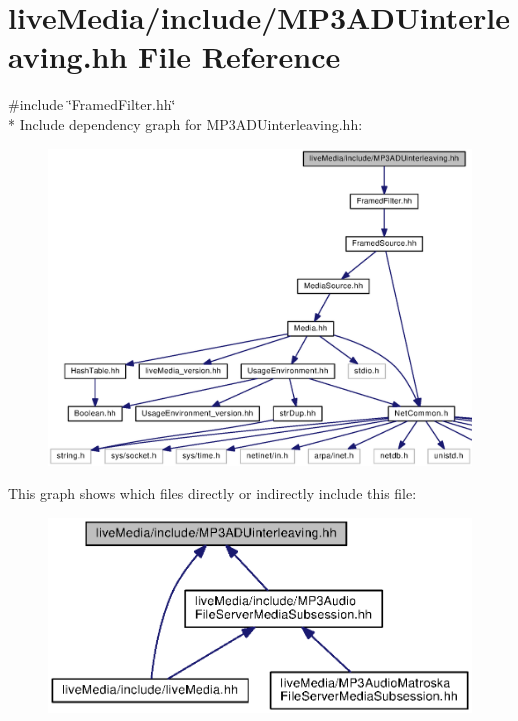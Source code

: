 \section{live\+Media/include/\+M\+P3\+A\+D\+Uinterleaving.hh File Reference}
\label{MP3ADUinterleaving_8hh}
{\ttfamily \#include \char`\"{}Framed\+Filter.\+hh\char`\"{}}\\*
Include dependency graph for M\+P3\+A\+D\+Uinterleaving.\+hh\+:
\nopagebreak
\begin{figure}[H]
\begin{center}
\leavevmode
\includegraphics[width=350pt]{MP3ADUinterleaving_8hh__incl}
\end{center}
\end{figure}
This graph shows which files directly or indirectly include this file\+:
\nopagebreak
\begin{figure}[H]
\begin{center}
\leavevmode
\includegraphics[width=350pt]{MP3ADUinterleaving_8hh__dep__incl}
\end{center}
\end{figure}
